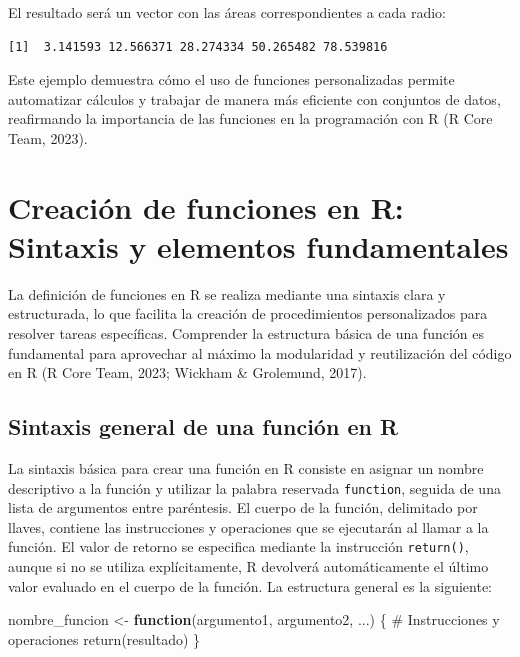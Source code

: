 \documentclass[
  spanish,
  a4paper,
  DIV=11,
  numbers=noendperiod,
  onepage,
  openany]{scrreprt}
\newenvironment{Shaded}{\begin{snugshade}}{\end{snugshade}}
\newcommand{\CommentTok}[1]{\textcolor[rgb]{0.37,0.37,0.37}{#1}}
\newcommand{\ControlFlowTok}[1]{\textcolor[rgb]{0.00,0.23,0.31}{\textbf{#1}}}
\newcommand{\FunctionTok}[1]{\textcolor[rgb]{0.28,0.35,0.67}{#1}}
\newcommand{\NormalTok}[1]{\textcolor[rgb]{0.00,0.23,0.31}{#1}}
\newcommand{\OtherTok}[1]{\textcolor[rgb]{0.00,0.23,0.31}{#1}}
\begin{document}
El resultado será un vector con las áreas correspondientes a cada radio:

\begin{verbatim}
[1]  3.141593 12.566371 28.274334 50.265482 78.539816
\end{verbatim}

Este ejemplo demuestra cómo el uso de funciones personalizadas permite
automatizar cálculos y trabajar de manera más eficiente con conjuntos de
datos, reafirmando la importancia de las funciones en la programación
con R (R Core Team, 2023).

\section{Creación de funciones en R: Sintaxis y elementos
fundamentales}\label{creaciuxf3n-de-funciones-en-r-sintaxis-y-elementos-fundamentales}

La definición de funciones en R se realiza mediante una sintaxis clara y
estructurada, lo que facilita la creación de procedimientos
personalizados para resolver tareas específicas. Comprender la
estructura básica de una función es fundamental para aprovechar al
máximo la modularidad y reutilización del código en R (R Core Team,
2023; Wickham \& Grolemund, 2017).

\subsection{Sintaxis general de una función en
R}\label{sintaxis-general-de-una-funciuxf3n-en-r}

La sintaxis básica para crear una función en R consiste en asignar un
nombre descriptivo a la función y utilizar la palabra reservada
\texttt{function}, seguida de una lista de argumentos entre paréntesis.
El cuerpo de la función, delimitado por llaves, contiene las
instrucciones y operaciones que se ejecutarán al llamar a la función. El
valor de retorno se especifica mediante la instrucción
\texttt{return()}, aunque si no se utiliza explícitamente, R devolverá
automáticamente el último valor evaluado en el cuerpo de la función. La
estructura general es la siguiente:

\begin{Shaded}
\begin{Highlighting}[]
\NormalTok{nombre\_funcion }\OtherTok{\textless{}{-}} \ControlFlowTok{function}\NormalTok{(argumento1, argumento2, ...) \{}
  \CommentTok{\# Instrucciones y operaciones}
  \FunctionTok{return}\NormalTok{(resultado)}
\NormalTok{\}}
\end{Highlighting}
\end{Shaded}
\end{document}
